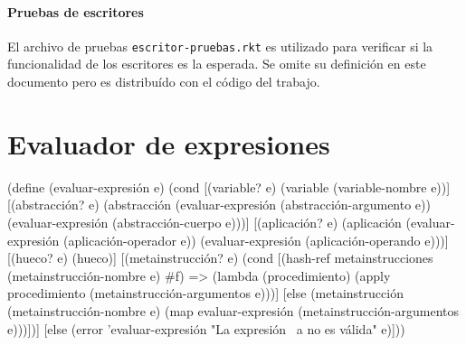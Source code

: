 \documentclass[letterpaper,twoside,openright,11pt]{book}
\begin{document}
\nwenddocs{}\paragraph{Pruebas de escritores} El archivo de pruebas {\tt{}escritor-pruebas.rkt} es utilizado para verificar si la funcionalidad de los escritores es la esperada. Se omite su definición en este documento pero es distribuído con el código del trabajo.


\nwenddocs{}\section*{Evaluador de expresiones}

\nwenddocs{}\endmoddef
(define (evaluar-expresión e)
  (cond
   [(variable? e)
    (variable (variable-nombre e))]
   [(abstracción? e)
    (abstracción (evaluar-expresión (abstracción-argumento e))
                 (evaluar-expresión (abstracción-cuerpo e)))]
   [(aplicación? e)
    (aplicación (evaluar-expresión (aplicación-operador e))
                (evaluar-expresión (aplicación-operando e)))]
   [(hueco? e)
    (hueco)]
   [(metainstrucción? e)
    (cond [(hash-ref metainstrucciones (metainstrucción-nombre e) #f) =>
           (lambda (procedimiento)
             (apply procedimiento (metainstrucción-argumentos e)))]
          [else
           (metainstrucción (metainstrucción-nombre e)
                            (map evaluar-expresión
                                 (metainstrucción-argumentos e)))])]
   [else
    (error 'evaluar-expresión "La expresión ~a no es válida" e)]))

\eatline
{}\nwendcode{}\nwdocspar
\end{document}
